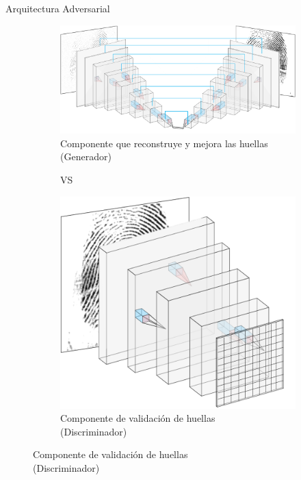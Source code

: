 \documentclass[12pt,aspectratio=169]{beamer}
\begin{document}
\begin{frame}{Arquitectura Adversarial}

   \begin{figure}
        \begin{subfigure}{0.54\textwidth}
            \centering
            \includegraphics[scale=0.3]{figs/layers_nn_u.PNG}
            \caption{Componente que reconstruye y mejora las huellas \\ (Generador)}
        \end{subfigure}
        \begin{subfigure}{0.1\textwidth}
            \centering VS
        \end{subfigure}
        \begin{subfigure}{0.3\textwidth}
            \centering
            \includegraphics[scale=0.22]{figs/disc_cuad.png}
            \caption{Componente de validación de huellas \\ (Discriminador)}
        \end{subfigure}
    \end{figure}

\end{frame}
\end{document}
